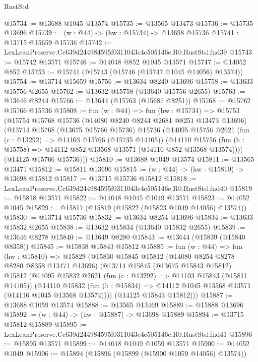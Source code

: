 \begin{lexlean}{RustStd}
\begin{coremodule}
@15734 := @13688 @1045 @13574
@15735 := @13565 @13473
@15736 := @15735 @13696
@15739 := (w : @44) -> (hw : @15734) -> @13698 @15736
@15741 := @13715 @15659 @15736
@15742 := LexLeanPreserve.Cc639d244984595f0311043c4c505146e.R0.RustStd.fnd39
@15743 := @15742 @13571
@15746 := @14048 @852 @1045 @13571
@15747 := @14052 @852
@15753 := @15741 (@15743 (@15746 (@15747 @1045 @14056) @13574))
@15754 := @13714 @15659
@15756 := @13634 @8240 @13696
@15758 := @13633 @15756 @2655
@15762 := @13632 @15758 (@13640 @15756 @2655)
@15763 := @13646 @8244
@15766 := @13644 (@15763 (@15687 @8251))
@15768 := @15762 @15766 @15736
@15808 := fun (w : @44) =>
  fun (hw : @15734) =>
  @15753
    (@15754
      @15768
      @15736
      (@14080 @8240 @8244 @2681 @8251 @13473 @13696)
      (@13714
        @15768
        (@13675 @15766 @15736)
        @15736
        (@14095
          @15756
          @2621
          (fun (c : @13292) => @14103 @15766 (@15735 @14105))
          (@14110
            @15756
            (fun (h : @15758) => @14112 @852 @13568 @13571 (@14116 @852 @13568 @13574))))
        (@14125 @15766 @15736)))
@15810 := @13688 @1049 @13574
@15811 := @13565 @13471
@15812 := @15811 @13696
@15815 := (w : @44) -> (hw : @15810) -> @13698 @15812
@15817 := @13715 @15736 @15812
@15818 := LexLeanPreserve.Cc639d244984595f0311043c4c505146e.R0.RustStd.fnd40
@15819 := @15818 @13571
@15822 := @14048 @1045 @1049 @13571
@15823 := @14052 @1045
@15829 := @15817 (@15819 (@15822 (@15823 @1049 @14056) @13574))
@15830 := @13714 @15736
@15832 := @13634 @8254 @13696
@15834 := @13633 @15832 @2655
@15838 := @13632 @15834 (@13640 @15832 @2655)
@15839 := @13646 @8278
@15840 := @13649 @8280
@15843 := @13644 (@15839 (@15840 @8358))
@15845 := @15838 @15843 @15812
@15885 := fun (w : @44) =>
  fun (hw : @15810) =>
  @15829
    (@15830
      @15845
      @15812
      (@14080 @8254 @8278 @8280 @8358 @13471 @13696)
      (@13714
        @15845
        (@13675 @15843 @15812)
        @15812
        (@14095
          @15832
          @2621
          (fun (c : @13292) => @14103 @15843 (@15811 @14105))
          (@14110
            @15832
            (fun (h : @15834) => @14112 @1045 @13568 @13571 (@14116 @1045 @13568 @13574))))
        (@14125 @15843 @15812)))
@15887 := @13688 @1059 @13574
@15888 := @13565 @13469
@15889 := @15888 @13696
@15892 := (w : @44) -> (hw : @15887) -> @13698 @15889
@15894 := @13715 @15812 @15889
@15895 := LexLeanPreserve.Cc639d244984595f0311043c4c505146e.R0.RustStd.fnd41
@15896 := @15895 @13571
@15899 := @14048 @1049 @1059 @13571
@15900 := @14052 @1049
@15906 := @15894 (@15896 (@15899 (@15900 @1059 @14056) @13574))

\end{coremodule}
\end{lexlean}

